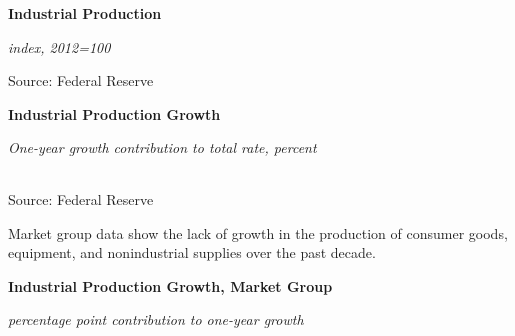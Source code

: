 \documentclass{report}
\makeatletter
\newcommand{\tbllink}[1]{\href{https://raw.githubusercontent.com/bdecon/US-chartbook/master/chartbook/data/#1}{\faTable}}
\newcommand*\short[1]{\expandafter\@gobbletwo\number\numexpr#1\relax}
\newcommand{\sbar}[4]{
		\addplot[ybar stacked, bar width=2.6pt, draw opacity=0, fill=#1] 
			table [x=#2, y=#3, col sep=comma]{#4};}
\newcommand{\dateaxisticks}{
		date coordinates in=x, axis line style={draw=none},
		xmax={2020-10-01},
		max space between ticks=40,	    
		xtick={{1990-01-01}, {1992-01-01}, {1994-01-01}, 
			{1996-01-01}, {1998-01-01}, {2000-01-01}, 
			{2002-01-01}, {2004-01-01}, {2006-01-01},
			{2008-01-01}, {2010-01-01}, {2012-01-01}, {2014-01-01},
		    {2016-01-01}, {2018-01-01}, {2020-01-01}},
		minor xtick={{1989-01-01}, {1991-01-01}, {1993-01-01},
			{1995-01-01}, {1997-01-01}, {1999-01-01}, 
			{2001-01-01}, {2003-01-01}, {2005-01-01}, {2007-01-01},
		    {2009-01-01}, {2011-01-01}, {2013-01-01}, {2015-01-01},
		    {2017-01-01}, {2019-01-01}},
		enlarge y limits={0.06}, enlarge x limits={0.01},
		}
\newcommand{\bbar}[2]{extra #1 ticks = {{#2}}, extra #1 tick labels = ,
		extra #1 tick style = {grid=major, grid style={thick, black!25}},}
\newcommand{\rbars}{
		\fill[color=black!10] (axis cs:{1990-07-01},\pgfkeysvalueof{/pgfplots/ymin}) rectangle 
			(axis cs:{1991-03-01}, \pgfkeysvalueof{/pgfplots/ymax});
		\fill[color=black!10] (axis cs:{2007-12-01},\pgfkeysvalueof{/pgfplots/ymin}) rectangle 
			(axis cs:{2009-07-01}, \pgfkeysvalueof{/pgfplots/ymax});
		\fill[color=black!10] (axis cs:{2001-03-01},\pgfkeysvalueof{/pgfplots/ymin}) rectangle 
			(axis cs:{2001-11-01}, \pgfkeysvalueof{/pgfplots/ymax});
		\fill[color=black!10] (axis cs:{2020-02-01},\pgfkeysvalueof{/pgfplots/ymin}) rectangle 
			(axis cs:{2020-10-01}, \pgfkeysvalueof{/pgfplots/ymax});}
\makeatother
\begin{document}
{{{{\begin{minipage}{0.35\textwidth}
\normalsize \textbf{Industrial Production}

\footnotesize{\textit{index, 2012=100}}


\footnotesize{Source: Federal Reserve} \hfill \tbllink{indpro.csv}
\end{minipage}

\vspace{2mm} 

\normalsize \textbf{Industrial Production Growth}
\vspace{-2mm}

\footnotesize{\textit{One-year growth \hspace{34mm} contribution to total \hspace{12mm} rate, percent}
\vspace{-2mm}

\noindent {} \setlength{\tabcolsep}{3.1pt} \color{black!90}
		{\renewcommand{\arraystretch}{1.54}
		 \begin{tabular}{p{2mm} p{44mm} R{7.3mm} R{7.3mm} R{7.3mm} R{7.3mm} | R{8mm} R{7.3mm} 
		   R{7.3mm} R{7.3mm} }
			 \hline
		\end{tabular}}	
		\vspace{-1mm}
		
\footnotesize{Source: Federal Reserve}}

\newpage
\begin{minipage}{0.76\textwidth}
\vspace{3mm}
\small Market group data show the lack of growth in the production of consumer goods, equipment, and nonindustrial supplies over the past decade.

\vspace{3mm}

\normalsize \textbf{Industrial Production Growth, Market Group}

\footnotesize{\textit{percentage point contribution to one-year growth}}

\hspace*{-2mm} 


\end{minipage}}}}}
\end{document}
